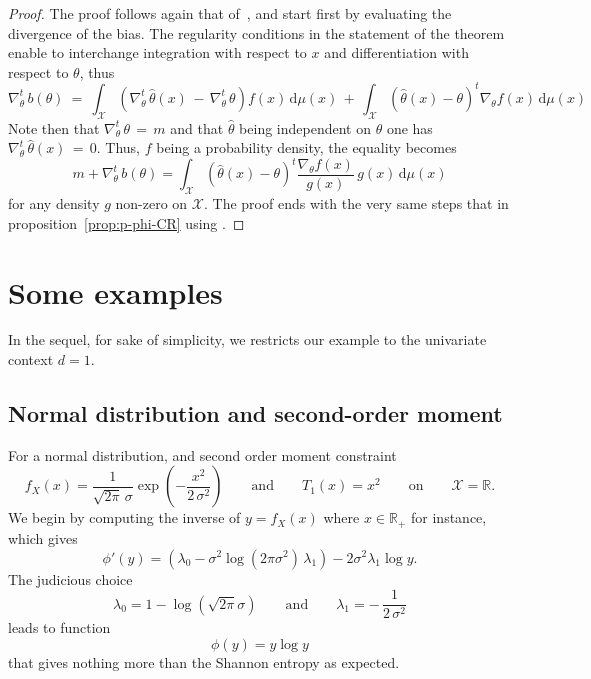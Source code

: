 \documentclass[english,sort&compress]{elsarticle}
\theoremstyle{definition}
\theoremstyle{plain}
\theoremstyle{plain}
\def\dmu{\mathrm{d}\mu}
\def\Rset{\mathbb{R}}
\def\X{\mathcal{X}}
\begin{document}
\begin{proof}
  The proof  follows again that  of~\cite{Ber13}, and start first  by evaluating
  the divergence of the bias.  The regularity conditions in the statement of the
  theorem   enable  to  interchange   integration  with   respect  to   $x$  and
  differentiation with respect to $\theta$, thus
  \[
  \nabla_\theta^t  \,  b(\theta)  \:  =  \: \int_\X  \left(  \nabla_\theta^t  \,
    \widehat{\theta}(x)  \,  - \,  \nabla_\theta^t  \,  \theta  \right) f(x)  \,
  \dmu(x)  \,  +  \,  \int_\X  \left(  \widehat{\theta}(x)  -  \theta  \right)^t
  \nabla_\theta f(x) \, \dmu(x)
  \]
  Note   then  that   $\nabla_\theta^t  \,   \theta  \,   =  \,   m$   and  that
  $\widehat{\theta}$  being independent  on  $\theta$ one  has $\nabla_\theta^t  \,
  \widehat{\theta}(x) \,  = \, 0$. Thus,  $f$ being a  probability density, the
  equality becomes
  \[
  m + \nabla_\theta^t \, b(\theta) = \int_\X \left( \widehat{\theta}(x) - \theta
  \right)^t \frac{\nabla_\theta f(x)}{g(x)} \, g(x) \, \dmu(x)
  \]
  for any density $g$ non-zero on $\X$.  The proof ends with the very same steps
  that in proposition~\ref{prop:p-phi-CR} using \cite[Lemma2]{Ber13}.
\end{proof}



\section{Some examples}
\label{sec:Examples}

In  the  sequel,  for sake  of  simplicity,  we  restricts  our example  to  the
univariate context $d = 1$.


\subsection{Normal distribution and second-order moment}
\label{subsec:NormalSecondOrder}

For a normal distribution, and second order moment constraint 
%
\[
f_X(x)  = \frac{1}{\sqrt{2\pi} \,\sigma}  \exp\left( -\frac{x^2}{2  \, \sigma^2}
\right)  \qquad \mbox{and}  \qquad T_1(x)  = x^2  \qquad \mbox{on}  \qquad  \X =
\Rset.
\]
%
We begin  by computing the  inverse of  $y = f_X(x)$  where $x \in  \Rset_+$ for
instance, which gives
%
\[
\phi'(y) = \left( \lambda_0 - \sigma^2 \log(2 \pi \sigma^2) \, \lambda_1 \right)
- 2 \sigma^2 \lambda_1 \log y.
\]
%
The judicious choice
%
\[
\lambda_0 = 1 - \log( \sqrt{2\pi}  \sigma ) \qquad \mbox{and} \qquad \lambda_1 =
- \, \frac{1}{2 \, \sigma^2}
\]
%
leads to function
%
\[
\phi(y) = y \log y
\]
%
that gives nothing more than the Shannon entropy as expected.
\end{document}
